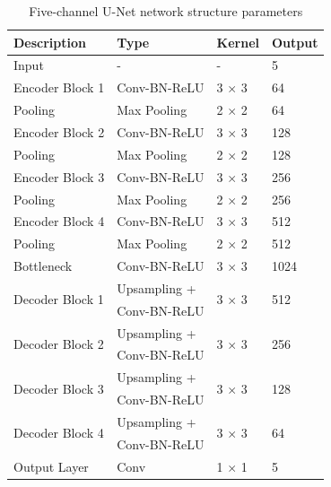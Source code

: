 \documentclass[
reprint,
superscriptaddress,
nofootinbib,
amsmath,amssymb,
aps,
prd,
]{revtex4-2}
\begin{document}
\begin{table}[htbp]
    \centering
    \caption{Five-channel U-Net network structure parameters}
    \label{tab:unet_architecture}
    \begin{tabular}{@{}p{2.6cm}p{2.5cm}p{1.4cm}p{1.4cm}@{}}
    \toprule
    \textbf{Description} & \textbf{Type} & \textbf{Kernel} & \textbf{Output} \\ \midrule
    Input & - & - & 5 \\
    Encoder Block 1 & Conv-BN-ReLU & 3 $\times$ 3 & 64 \\
    Pooling & Max Pooling & 2 $\times$ 2 & 64 \\
    Encoder Block 2 & Conv-BN-ReLU & 3 $\times$ 3 & 128 \\
    Pooling & Max Pooling & 2 $\times$ 2 & 128 \\
    Encoder Block 3 & Conv-BN-ReLU & 3 $\times$ 3 & 256 \\
    Pooling & Max Pooling & 2 $\times$ 2 & 256 \\
    Encoder Block 4 & Conv-BN-ReLU & 3 $\times$ 3 & 512 \\
    Pooling & Max Pooling & 2 $\times$ 2 & 512 \\
    Bottleneck & Conv-BN-ReLU & 3 $\times$ 3 & 1024 \\
    \multirow{2}{*}{Decoder Block 1} & Upsampling + & \multirow{2}{*}{3 $\times$ 3} & \multirow{2}{*}{512} \\
    & Conv-BN-ReLU & & \\
    \multirow{2}{*}{Decoder Block 2} & Upsampling + & \multirow{2}{*}{3 $\times$ 3} & \multirow{2}{*}{256} \\
    & Conv-BN-ReLU & & \\
    \multirow{2}{*}{Decoder Block 3} & Upsampling + & \multirow{2}{*}{3 $\times$ 3} & \multirow{2}{*}{128} \\
    & Conv-BN-ReLU & & \\
    \multirow{2}{*}{Decoder Block 4} & Upsampling + & \multirow{2}{*}{3 $\times$ 3} & \multirow{2}{*}{64} \\
    & Conv-BN-ReLU & & \\
    Output Layer & Conv & 1 $\times$ 1 & 5 \\ \bottomrule
    \end{tabular}
\end{table}
\end{document}
